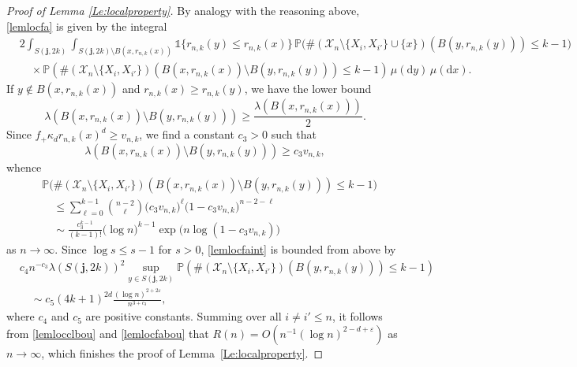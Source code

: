 \documentclass{article}
\theoremstyle{thm}
\theoremstyle{definition}
\theoremstyle{definition}
\theoremstyle{def}
\newcommand{\PP}{\mathbb{P}} %
\newcommand{\jj}{\mathbf{j}}
\begin{document}
\begin{proof}[Proof of Lemma \ref{Le:localproperty}]
	By analogy with the reasoning above, \eqref{lemlocfa} is given by the integral
	\begin{align}
		&2\int_{S(\jj,2k)}\int_{S(\jj,2k) \setminus B(x,r_{n,k}(x))} \mathds{1}\{r_{n,k}(y) \le r_{n,k}(x)\} \,\PP\big(\#(\mathcal{X}_n \setminus \{X_i,X_{i'}\} \cup \{x\})(B(y,r_{n,k}(y))) \le k-1\big)\nonumber\\
		&\quad \times  \PP(\#(\mathcal{X}_n \setminus \{X_i,X_{i'}\})(B(x,r_{n,k}(x))\setminus B(y,r_{n,k}(y)))\le k-1)\,  \mu(\mathrm{d}y)\,\mu(\mathrm{d}x). \label{lemlocfaint}
	\end{align}
	If $y \notin B(x,r_{n,k}(x))$ and $r_{n,k}(x)\ge r_{n,k}(y)$, we have the lower bound
	\[
	\lambda(B(x,r_{n,k}(x))\setminus B(y,r_{n,k}(y))) \ge \frac{\lambda(B(x,r_{n,k}(x)))}{2}.
	\]
	Since {$f_+ \kappa_d r_{n,k}(x)^d \geq v_{n,k}$}, we find a constant $c_3>0$ such that
	\[
	\lambda(B(x,r_{n,k}(x))\setminus B(y,r_{n,k}(y))) \ge c_3 v_{n,k},
	\]
	whence
	\begin{align*}
		&\PP\big(\#(\mathcal{X}_n \setminus \{X_i,X_{i'}\})(B(x,r_{n,k}(x))\setminus B(y,r_{n,k}(y)))\le k-1\big)\\
		&\quad \le \sum_{\ell=0}^{k-1} \binom{n-2}{\ell} \big(c_3v_{n,k}\big)^\ell \big(1-c_3v_{n,k}\big)^{n-2-\ell}\\
		&\quad \sim \frac{c_3^{k-1}}{(k-1)!} \big(\log n\big)^{k-1} \exp \big(n \log (1-c_3v_{n,k})\big)
	\end{align*}
	as $n \to \infty$. Since $\log s \le s-1$ for $s>0$, \eqref{lemlocfaint} is bounded from above by
	\begin{align}
		&c_4 n^{-c_3} \lambda(S(\jj,2k))^2 \sup_{y \in S(\jj,2k)} \PP(\#(\mathcal{X}_n \setminus \{X_i,X_{i'}\})(B(y,r_{n,k}(y)))\le k-1)\nonumber\\
		&\quad \sim c_5 (4k+1)^{2d} \frac{(\log n)^{2+2\varepsilon}}{n^{3+c_3}}, \label{lemlocfabou}
	\end{align}
where $c_4$ and $c_5$ are positive constants.  {Summing over all $i\neq i'\leq n$, it follows} from  \eqref{lemlocclbou} and  \eqref{lemlocfabou} 
	that $R(n)=O(n^{-1}(\log n)^{2-d+\varepsilon})$ as $n \to \infty$, {which} finishes the proof of Lemma~\ref{Le:localproperty}.
\end{proof}
\end{document}
